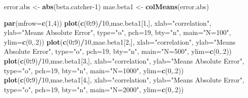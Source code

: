 \documentclass[]{article}
\newenvironment{Shaded}{\begin{snugshade}}{\end{snugshade}}
\newcommand{\DataTypeTok}[1]{\textcolor[rgb]{0.13,0.29,0.53}{#1}}
\newcommand{\DecValTok}[1]{\textcolor[rgb]{0.00,0.00,0.81}{#1}}
\newcommand{\KeywordTok}[1]{\textcolor[rgb]{0.13,0.29,0.53}{\textbf{#1}}}
\newcommand{\NormalTok}[1]{#1}
\newcommand{\OperatorTok}[1]{\textcolor[rgb]{0.81,0.36,0.00}{\textbf{#1}}}
\newcommand{\StringTok}[1]{\textcolor[rgb]{0.31,0.60,0.02}{#1}}
\begin{document}
\begin{Shaded}
\begin{Highlighting}[]
\NormalTok{error.abs <-}\StringTok{ }\KeywordTok{abs}\NormalTok{(beta.catcher}\DecValTok{-1}\NormalTok{)}
\NormalTok{mae.beta1 <-}\StringTok{ }\KeywordTok{colMeans}\NormalTok{(error.abs)}

\KeywordTok{par}\NormalTok{(}\DataTypeTok{mfrow=}\KeywordTok{c}\NormalTok{(}\DecValTok{1}\NormalTok{,}\DecValTok{4}\NormalTok{))}
\KeywordTok{plot}\NormalTok{(}\KeywordTok{c}\NormalTok{(}\DecValTok{0}\OperatorTok{:}\DecValTok{9}\NormalTok{)}\OperatorTok{/}\DecValTok{10}\NormalTok{,mae.beta1[}\DecValTok{1}\NormalTok{,], }\DataTypeTok{xlab=}\StringTok{"correlation"}\NormalTok{, }\DataTypeTok{ylab=}\StringTok{"Means Absolute Error"}\NormalTok{, }\DataTypeTok{type=}\StringTok{"o"}\NormalTok{, }\DataTypeTok{pch=}\DecValTok{19}\NormalTok{, }\DataTypeTok{bty=}\StringTok{"n"}\NormalTok{, }\DataTypeTok{main=}\StringTok{"N=100"}\NormalTok{, }\DataTypeTok{ylim=}\KeywordTok{c}\NormalTok{(}\DecValTok{0}\NormalTok{,.}\DecValTok{2}\NormalTok{))}
\KeywordTok{plot}\NormalTok{(}\KeywordTok{c}\NormalTok{(}\DecValTok{0}\OperatorTok{:}\DecValTok{9}\NormalTok{)}\OperatorTok{/}\DecValTok{10}\NormalTok{,mae.beta1[}\DecValTok{2}\NormalTok{,], }\DataTypeTok{xlab=}\StringTok{"correlation"}\NormalTok{, }\DataTypeTok{ylab=}\StringTok{"Means Absolute Error"}\NormalTok{, }\DataTypeTok{type=}\StringTok{"o"}\NormalTok{, }\DataTypeTok{pch=}\DecValTok{19}\NormalTok{, }\DataTypeTok{bty=}\StringTok{"n"}\NormalTok{, }\DataTypeTok{main=}\StringTok{"N=500"}\NormalTok{, }\DataTypeTok{ylim=}\KeywordTok{c}\NormalTok{(}\DecValTok{0}\NormalTok{,.}\DecValTok{2}\NormalTok{))}
\KeywordTok{plot}\NormalTok{(}\KeywordTok{c}\NormalTok{(}\DecValTok{0}\OperatorTok{:}\DecValTok{9}\NormalTok{)}\OperatorTok{/}\DecValTok{10}\NormalTok{,mae.beta1[}\DecValTok{3}\NormalTok{,], }\DataTypeTok{xlab=}\StringTok{"correlation"}\NormalTok{, }\DataTypeTok{ylab=}\StringTok{"Means Absolute Error"}\NormalTok{, }\DataTypeTok{type=}\StringTok{"o"}\NormalTok{, }\DataTypeTok{pch=}\DecValTok{19}\NormalTok{, }\DataTypeTok{bty=}\StringTok{"n"}\NormalTok{, }\DataTypeTok{main=}\StringTok{"N=1000"}\NormalTok{, }\DataTypeTok{ylim=}\KeywordTok{c}\NormalTok{(}\DecValTok{0}\NormalTok{,.}\DecValTok{2}\NormalTok{))}
\KeywordTok{plot}\NormalTok{(}\KeywordTok{c}\NormalTok{(}\DecValTok{0}\OperatorTok{:}\DecValTok{9}\NormalTok{)}\OperatorTok{/}\DecValTok{10}\NormalTok{,mae.beta1[}\DecValTok{4}\NormalTok{,], }\DataTypeTok{xlab=}\StringTok{"correlation"}\NormalTok{, }\DataTypeTok{ylab=}\StringTok{"Means Absolute Error"}\NormalTok{, }\DataTypeTok{type=}\StringTok{"o"}\NormalTok{, }\DataTypeTok{pch=}\DecValTok{19}\NormalTok{, }\DataTypeTok{bty=}\StringTok{"n"}\NormalTok{, }\DataTypeTok{main=}\StringTok{"N=2000"}\NormalTok{, }\DataTypeTok{ylim=}\KeywordTok{c}\NormalTok{(}\DecValTok{0}\NormalTok{,.}\DecValTok{2}\NormalTok{))}
\end{Highlighting}
\end{Shaded}
\end{document}
